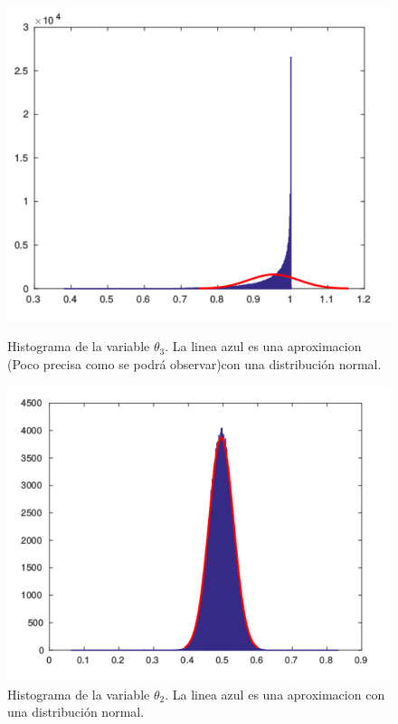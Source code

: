 \begin{figure}[H]
\begin{minipage}{0.45\textwidth}
 \centering
\includegraphics[width=1.0\textwidth]{imgs/theta3.pdf}
	\caption{\footnotesize Histograma de la variable $\theta_3$. La linea azul es una aproximacion (Poco precisa como se podrá observar)con una distribución normal.}
\end{minipage}
\hspace{0.1\textwidth}
\begin{minipage}{0.45\textwidth}
 \centering
\includegraphics[width=1.0\textwidth]{imgs/theta2.pdf}
	\caption{\footnotesize Histograma de la variable $\theta_2$. La linea azul es una aproximacion con una distribución normal.}
\end{minipage}
\end{figure}

